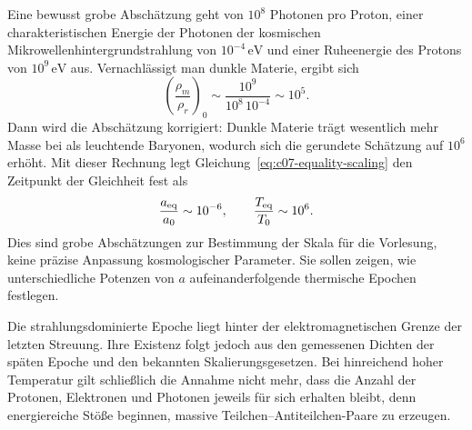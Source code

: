 Eine bewusst grobe Abschätzung geht von \(10^8\) Photonen pro Proton, einer charakteristischen Energie der Photonen der kosmischen Mikrowellenhintergrundstrahlung von \(10^{-4}\,\mathrm{eV}\) und einer Ruheenergie des Protons von \(10^9\,\mathrm{eV}\) aus. Vernachlässigt man dunkle Materie, ergibt sich
\begin{equation}
\left(\frac{\rho_m}{\rho_r}\right)_0
\sim
\frac{10^9}{10^8\,10^{-4}}
\sim10^5.
\end{equation}
Dann wird die Abschätzung korrigiert: Dunkle Materie trägt wesentlich mehr Masse bei als leuchtende Baryonen, wodurch sich die gerundete Schätzung auf \(10^6\) erhöht. Mit dieser Rechnung legt Gleichung~\eqref{eq:c07-equality-scaling} den Zeitpunkt der Gleichheit fest als
\begin{equation}
\frac{a_{\rm eq}}{a_0}\sim10^{-6},
\qquad
\frac{T_{\rm eq}}{T_0}\sim10^6.
\label{eq:c07-equality-estimate}
\end{equation}
Dies sind grobe Abschätzungen zur Bestimmung der Skala für die Vorlesung, keine präzise Anpassung kosmologischer Parameter. Sie sollen zeigen, wie unterschiedliche Potenzen von \(a\) aufeinanderfolgende thermische Epochen festlegen.

Die strahlungsdominierte Epoche liegt hinter der elektromagnetischen Grenze der letzten Streuung. Ihre Existenz folgt jedoch aus den gemessenen Dichten der späten Epoche und den bekannten Skalierungsgesetzen. Bei hinreichend hoher Temperatur gilt schließlich die Annahme nicht mehr, dass die Anzahl der Protonen, Elektronen und Photonen jeweils für sich erhalten bleibt, denn energiereiche Stöße beginnen, massive Teilchen--Antiteilchen-Paare zu erzeugen.

\begin{classroomqa}
\end{classroomqa}

